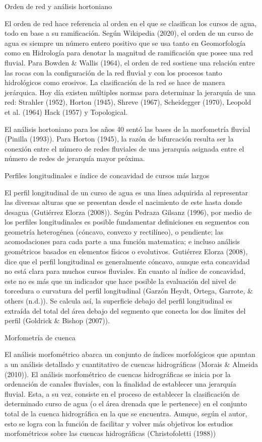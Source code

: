 \documentclass[11pt,]{article}
\begin{document}
Orden de red y análisis hortoniano

El orden de red hace referencia al orden en el que se clasifican los
cursos de agua, todo en base a su ramificación. Según Wikipedia (2020),
el orden de un curso de agua es siempre un número entero positivo que se
usa tanto en Geomorfología como en Hidrología para denotar la magnitud
de ramificación que posee una red fluvial. Para Bowden \& Wallis (1964),
el orden de red sostiene una relación entre las rocas con la
configuración de la red fluvial y con los procesos tanto hidrológicos
como erosivos. La clasificación de la red se hace de manera jerárquica.
Hoy día existen múltiples normas para determinar la jerarquía de una
red: Strahler (1952), Horton (1945), Shreve (1967), Scheidegger (1970),
Leopold et al. (1964) Hack (1957) y Topological.

El análisis hortoniano para los años 40 sentó las bases de la
morfometría fluvial (Pinilla (1993)). Para Horton (1945), la razón de
bifurcación resulta ser la conexión entre el número de redes fluviales
de una jerarquía asignada entre el número de redes de jerarquía mayor
próxima.

Perfiles longitudinales e índice de concavidad de cursos más largos

El perfil longitudinal de un curso de agua es una línea adquirida al
representar las diversas alturas que se presentan desde el nacimiento de
este hasta donde desagua (Gutiérrez Elorza (2008)). Según Pedraza
Gilsanz (1996), por medio de los perfiles longitudinales es posible
fundamentar definiciones en segmentos con geometría heterogénea
(cóncavo, convexo y rectilíneo), o pendiente; las acomodaciones para
cada parte a una función matematica; e incluso análisis geométricos
basados en elementos físicos o evolutivos. Gutiérrez Elorza (2008), dice
que el perfil longitudinal es generalmente cóncavo, aunque esta
concavidad no está clara para muchos cursos fluviales. En cuanto al
índice de concavidad, este no es más que un indicador que hace posible
la evaluación del nivel de torcedura o curvatura del perfil longitudinal
(Garzón Heydt, Ortega, Garrote, \& others (n.d.)). Se calcula así, la
superficie debajo del perfil longitudinal es extraída del total del área
debajo del segmento que conecta los dos límites del perfil (Goldrick \&
Bishop (2007)).

Morfometría de cuenca

El análisis morfométrico abarca un conjunto de índices morfológicos que
apuntan a un análisis detallado y cuantitativo de cuencas hidrográficas
(Morais \& Almeida (2010)). El análisis morfométrico de cuencas
hidrográficas se inicia por la ordenación de canales fluviales, con la
finalidad de establecer una jerarquía fluvial. Esta, a su vez, consiste
en el proceso de establecer la clasificación de determinado curso de
agua (o el área drenada que le pertenece) en el conjunto total de la
cuenca hidrográfica en la que se encuentra. Aunque, según el autor, esto
se logra con la función de facilitar y volver más objetivos los estudios
morfométricos sobre las cuencas hidrográficas (Christofoletti (1988))
\end{document}
